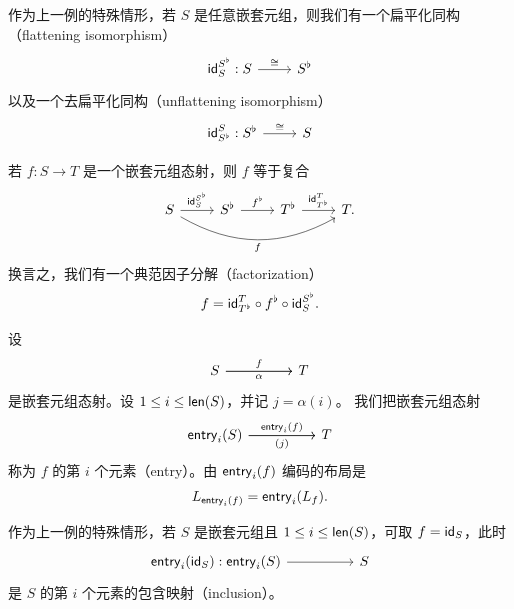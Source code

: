 \begin{example}[扁平化]\label{definitionofflatteningisomorphisms}
    作为上一例的特殊情形，若 $S$ 是任意嵌套元组，则我们有一个扁平化同构（flattening isomorphism）
    \[\begin{tikzcd}
    \id_S^{S^\flat} : S \ar[r,"\cong"] & S^\flat
    \end{tikzcd} \]
    以及一个去扁平化同构（unflattening isomorphism）
    \[\begin{tikzcd}
    \id_{S^\flat}^{S} : S^\flat \ar[r,"\cong"] & S
    \end{tikzcd}\]
\end{example}

\begin{observation}
    若 $f:S \to T$ 是一个嵌套元组态射，则 $f$ 等于复合
    \[ \begin{tikzcd}
    S \ar[r,"\id_S^{S^\flat}"] \ar[rrr,swap,bend right = 30, "f"] & S^\flat \ar[r,"f^\flat"] & T^\flat \ar[r,"\id_{T^\flat}^T"] & T.
    \end{tikzcd} \]
    换言之，我们有一个典范因子分解（factorization）
    \[
    f = \mathsf{id}_{T^\flat}^T \circ f^\flat \circ \mathsf{id}_S^{S^\flat}.
    \]
\end{observation}

\begin{example}[元素]\label{definitionofentriesofnestedtuplemorphisms}
    设
    \[ \begin{tikzcd}
S \ar[rr,"f"] \ar[rr,swap,"\alpha"] & & T
    \end{tikzcd}\]
    是嵌套元组态射。设 $1 \leq i \leq \mathsf{len}(S)$，并记 $j = \alpha(i)$。
    我们把嵌套元组态射
    \[ \begin{tikzcd}
    \entry_i(S) \ar[rr,"\entry_i(f)"] \ar[rr,swap,"(j)"]& & T
    \end{tikzcd} \]
    称为 $f$ 的第 $i$ 个元素（entry）。由 $\mathsf{entry}_i(f)$ 编码的布局是
    \[
    L_{\mathsf{entry}_i(f)} = \mathsf{entry}_i(L_f) .
    \]
\end{example}

\begin{example}[元素包含]
    作为上一例的特殊情形，若 $S$ 是嵌套元组且 $1 \leq i \leq \mathsf{len}(S)$，可取 $f = \mathsf{id}_S$，此时
    \[ \begin{tikzcd}
\entry_i(\id_S):\entry_i(S) \ar[rr] & & S
    \end{tikzcd}\]
    是 $S$ 的第 $i$ 个元素的包含映射（inclusion）。
\end{example}

